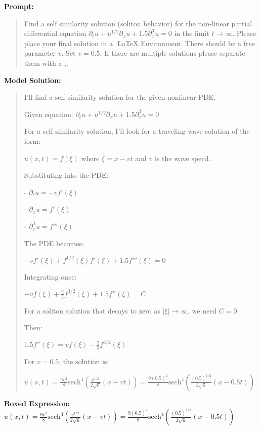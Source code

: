 \documentclass{article}
\begin{document}
\textbf{Prompt:}
\begin{quote}
Find a self similarity solution (soliton behavior) for the non-linear partial differential equation $ \partial_t u + u^{1/2} \partial_x u + 1.5\partial_x^3 u = 0 $ in the limit $t\to\infty$. Please place your final solution in a $\boxed{}$ LaTeX Environment. There should be a free parameter $v$. Set $v=0.5$. If there are multiple solutions please separate them with a ;.
\end{quote}
\textbf{Model Solution:}
\begin{quote}
I'll find a self-similarity solution for the given nonlinear PDE.



Given equation: $\partial_t u + u^{1/2} \partial_x u + 1.5\partial_x^3 u = 0$



For a self-similarity solution, I'll look for a traveling wave solution of the form:

$u(x,t) = f(\xi)$ where $\xi = x - vt$ and $v$ is the wave speed.



Substituting into the PDE:

- $\partial_t u = -v f'(\xi)$

- $\partial_x u = f'(\xi)$

- $\partial_x^3 u = f'''(\xi)$



The PDE becomes:

$-v f'(\xi) + f^{1/2}(\xi) f'(\xi) + 1.5f'''(\xi) = 0$



Integrating once:

$-v f(\xi) + \frac{2}{3}f^{3/2}(\xi) + 1.5f''(\xi) = C$



For a soliton solution that decays to zero as $|\xi| \to \infty$, we need $C = 0$.



Then:

$1.5f''(\xi) = vf(\xi) - \frac{2}{3}f^{3/2}(\xi)$



For $v = 0.5$, the solution is:



$\boxed{u(x,t) = \frac{9v^2}{8} \text{sech}^4\left(\frac{v^{1/2}}{2\sqrt{6}}(x-vt)\right) = \frac{9(0.5)^2}{8} \text{sech}^4\left(\frac{(0.5)^{1/2}}{2\sqrt{6}}(x-0.5t)\right)}$
\end{quote}
\textbf{Boxed Expression:} $u(x,t) = \frac{9v^2}{8} \text{sech}^4\left(\frac{v^{1/2}}{2\sqrt{6}}(x-vt)\right) = \frac{9(0.5)^2}{8} \text{sech}^4\left(\frac{(0.5)^{1/2}}{2\sqrt{6}}(x-0.5t)\right)$
\end{document}
